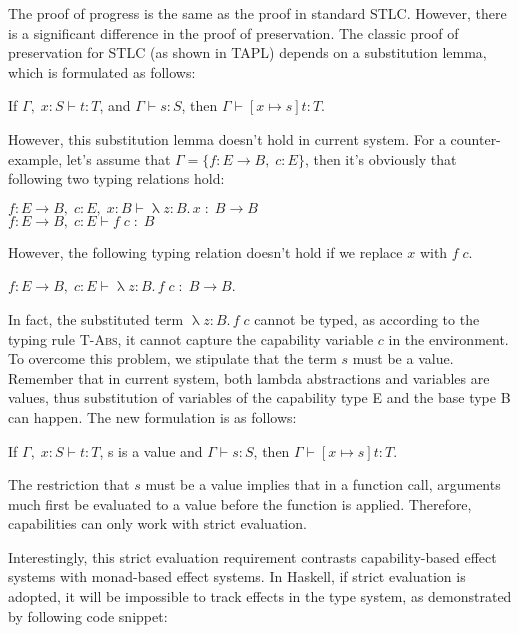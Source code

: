 The proof of progress is the same as the proof in standard
STLC. However, there is a significant difference in the proof of
preservation. The classic proof of preservation for STLC (as shown in
TAPL) depends on a substitution lemma, which is formulated as follows:

\begin{lemma}
If $\Gamma,\; x:S \vdash t : T$, and $\Gamma \vdash s : S$, then $\Gamma
\vdash [x \mapsto s]t : T$.
\end{lemma}

However, this substitution lemma doesn't hold in current system. For a
counter-example, let's assume that $\Gamma = \{f: E \to B,\; c:E\}$,
then it's obviously that following two typing relations hold:

$f: E \to B,\; c:E,\; x:B \vdash \uplambda z{:}B.\,x \; : \; B \to B$ \\
$f: E \to B,\; c:E \vdash f \; c \; : \; B$

However, the following typing relation doesn't hold if we replace $x$
with $f \; c$.

$f: E \to B,\; c:E \vdash \uplambda z{:}B.\,f \; c \; : \; B \to B$.

In fact, the substituted term $\uplambda z{:}B.\,f \; c$ cannot be
typed, as according to the typing rule \textsc{T-Abs}, it cannot
capture the capability variable $c$ in the environment. To overcome
this problem, we stipulate that the term $s$ must be a value. Remember
that in current system, both lambda abstractions and variables are
values, thus substitution of variables of the capability type E and
the base type B can happen. The new formulation is as follows:

\begin{lemma}
  If $\Gamma,\; x:S \vdash t : T$, s is a value and
  $\Gamma \vdash s : S$, then $\Gamma \vdash [x \mapsto s]t : T$.
\end{lemma}

The restriction that $s$ must be a value implies that in a function
call, arguments much first be evaluated to a value before the function
is applied. Therefore, capabilities can only work with strict
evaluation.

Interestingly, this strict evaluation requirement contrasts
capability-based effect systems with monad-based effect systems. In
Haskell, if strict evaluation is adopted, it will be impossible to
track effects in the type system, as demonstrated by following code
snippet:

